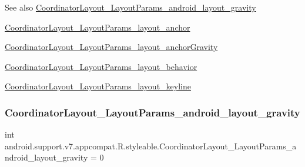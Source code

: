 \begin{DoxySeeAlso}{See also}
\hyperlink{classandroid_1_1support_1_1v7_1_1appcompat_1_1R_1_1styleable_a2bbafef211aa759215c44685dec3bdfb}{Coordinator\+Layout\+\_\+\+Layout\+Params\+\_\+android\+\_\+layout\+\_\+gravity} 

\hyperlink{classandroid_1_1support_1_1v7_1_1appcompat_1_1R_1_1styleable_a0326fdc342fc459e0f22e865f9bafa9b}{Coordinator\+Layout\+\_\+\+Layout\+Params\+\_\+layout\+\_\+anchor} 

\hyperlink{classandroid_1_1support_1_1v7_1_1appcompat_1_1R_1_1styleable_ac5930c177fccf3156cc93d585d9e2e9c}{Coordinator\+Layout\+\_\+\+Layout\+Params\+\_\+layout\+\_\+anchor\+Gravity} 

\hyperlink{classandroid_1_1support_1_1v7_1_1appcompat_1_1R_1_1styleable_a3c5485968079da7140d1094aeaed49d7}{Coordinator\+Layout\+\_\+\+Layout\+Params\+\_\+layout\+\_\+behavior} 

\hyperlink{classandroid_1_1support_1_1v7_1_1appcompat_1_1R_1_1styleable_a71b92f33ca3d04c4ead0d908659739bf}{Coordinator\+Layout\+\_\+\+Layout\+Params\+\_\+layout\+\_\+keyline} 
\end{DoxySeeAlso}
\mbox{\label{classandroid_1_1support_1_1v7_1_1appcompat_1_1R_1_1styleable_a2bbafef211aa759215c44685dec3bdfb}} 
\subsubsection{\texorpdfstring{Coordinator\+Layout\+\_\+\+Layout\+Params\+\_\+android\+\_\+layout\+\_\+gravity}{CoordinatorLayout\_LayoutParams\_android\_layout\_gravity}}
{\footnotesize\ttfamily int android.\+support.\+v7.\+appcompat.\+R.\+styleable.\+Coordinator\+Layout\+\_\+\+Layout\+Params\+\_\+android\+\_\+layout\+\_\+gravity = 0\hspace{0.3cm}{\ttfamily [static]}}

